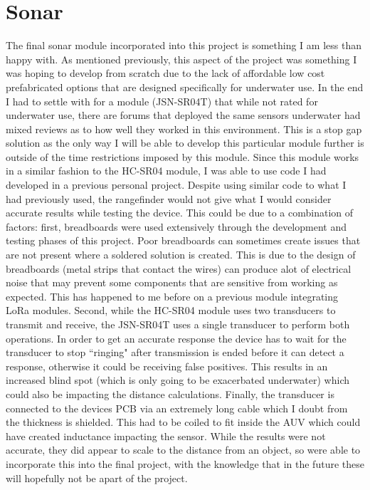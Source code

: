 \documentclass[11pt,a4paper,titlepage]{report}
\begin{document}
	\section*{Sonar}
	The final sonar module incorporated into this project is something I am less than happy with. As mentioned previously, this aspect of the project was something I was hoping to develop from scratch due to the lack of affordable low cost prefabricated options that are designed specifically for underwater use. In the end I had to settle with for a module (JSN-SR04T\cite{JSN_SR04T}) that while not rated for underwater use, there are forums that deployed the same sensors underwater had mixed reviews as to how well they worked in this environment. This is a stop gap solution as the only way I will be able to develop this particular module further is outside of the time restrictions imposed by this module. Since this module works in a similar fashion to the HC-SR04 module\cite{HC_SR04}, I was able to use code I had developed in a previous personal project\cite{STUART}. Despite using similar code to what I had previously used, the rangefinder would not give what I would consider accurate results while testing the device. This could be due to a combination of factors: first, breadboards were used extensively through the development and testing phases of this project. Poor breadboards can sometimes create issues that are not present where a soldered solution is created. This is due to the design of breadboards (metal strips that contact the wires) can produce alot of electrical noise that may prevent some components that are sensitive from working as expected. This has happened to me before on a previous module integrating LoRa modules. Second, while the HC-SR04 module uses two transducers to transmit and receive, the JSN-SR04T uses a single transducer to perform both operations. In order to get an accurate response the device has to wait for the transducer to stop ``ringing" after transmission is ended before it can detect a response, otherwise it could be receiving false positives. This results in an increased blind spot (which is only going to be exacerbated underwater) which could also be impacting the distance calculations. Finally, the transducer is connected to the devices PCB via an extremely long cable which I doubt from the thickness is shielded. This had to be coiled to fit inside the AUV which could have created inductance impacting the sensor. While the results were not accurate, they did appear to scale to the distance from an object, so were able to incorporate this into the final project, with the knowledge that in the future these will hopefully not be apart of the project. 
	
\end{document}
